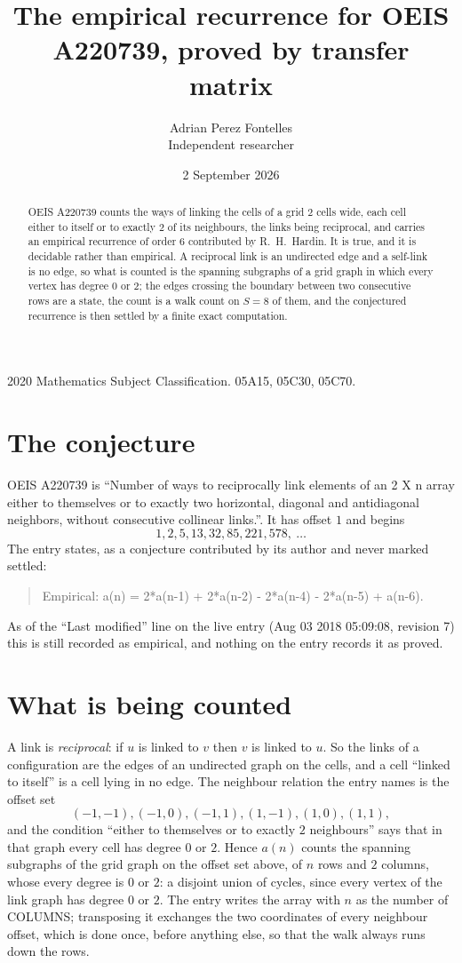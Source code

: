 \documentclass[11pt,a4paper]{article}
\title{The empirical recurrence for OEIS A220739, proved by transfer matrix}
\author{Adrian Perez Fontelles\\ \small Independent researcher}
\date{2 September 2026}
\theoremstyle{plain}
\theoremstyle{definition}
\begin{document}
\maketitle

\begin{abstract}
OEIS A220739 counts the ways of linking the cells of a grid $2$ cells wide, each cell either to
itself or to exactly $2$ of its neighbours, the links being reciprocal, and carries an
empirical recurrence of order $6$ contributed by R.~H.~Hardin. It is true, and it is
decidable rather than empirical. A reciprocal link is an undirected edge and a self-link is
no edge, so what is counted is the spanning subgraphs of a grid graph in which every vertex
has degree $0$ or $2$; the edges crossing the boundary between two consecutive rows are a
state, the count is a walk count on $S=8$ of them, and the conjectured recurrence is then
settled by a finite exact computation.
\end{abstract}

\noindent\small 2020 Mathematics Subject Classification. 05A15, 05C30, 05C70.\normalsize

\section{The conjecture}

OEIS A220739 is ``Number of ways to reciprocally link elements of an 2 X n array either to themselves or to exactly two horizontal, diagonal and antidiagonal neighbors, without consecutive collinear links.''. It has offset $1$ and begins
\[
1, 2, 5, 13, 32, 85, 221, 578,\ \dots
\]
The entry states, as a conjecture contributed by its author and never marked settled:
\begin{quote}
Empirical: a(n) = 2*a(n-1) + 2*a(n-2) - 2*a(n-4) - 2*a(n-5) + a(n-6).
\end{quote}
As of the ``Last modified'' line on the live entry (Aug 03 2018 05:09:08, revision 7) this is still
recorded as empirical, and nothing on the entry records it as proved.

\section{What is being counted}

A link is \emph{reciprocal}: if $u$ is linked to $v$ then $v$ is linked to $u$. So the links
of a configuration are the edges of an undirected graph on the cells, and a cell ``linked to
itself'' is a cell lying in no edge. The neighbour relation the entry names is the offset set
\[
(-1,-1), (-1,0), (-1,1), (1,-1), (1,0), (1,1),
\]
and the condition ``either to themselves or to exactly $2$ neighbours'' says that in that
graph every cell has degree $0$ or $2$. Hence $a(n)$ counts the spanning subgraphs of the
grid graph on the offset set above, of $n$ rows and $2$ columns,
whose every degree is $0$ or $2$: a disjoint union of cycles, since every vertex of the link graph has degree $0$ or $2$. The entry writes the array with $n$ as the number of COLUMNS; transposing it exchanges the two coordinates of every neighbour offset, which is done once, before anything else, so that the walk always runs down the rows.
\end{document}
